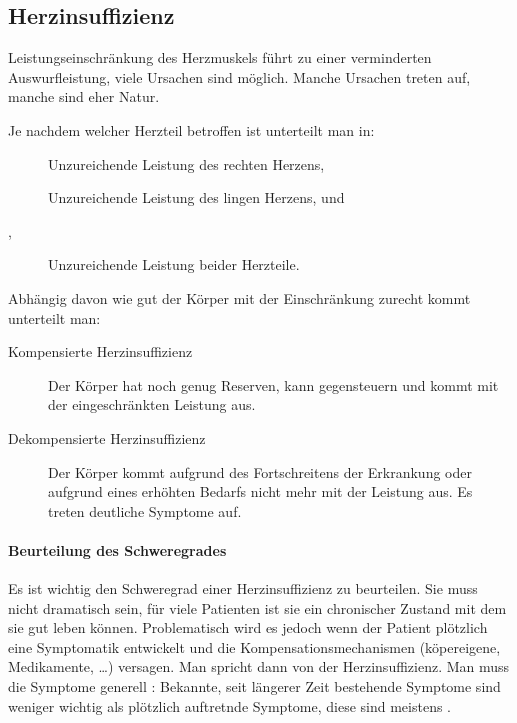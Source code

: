 \subsection{Herzinsuffizienz}


Leistungseinschränkung des Herzmuskels f\"uhrt zu einer verminderten
Auswurfleistung, viele Ursachen sind m\"oglich. Manche Ursachen treten
 auf, manche sind eher  Natur.

Je nachdem welcher Herzteil betroffen ist unterteilt man in:

\begin{description}
	\item[] Unzureichende Leistung des rechten Herzens, 
	\item[ ] Unzureichende Leistung des lingen Herzens, und
	\item[,] Unzureichende Leistung beider Herzteile.  
\end{description}

Abhängig davon wie gut der Körper mit der Einschränkung zurecht kommt unterteilt man: 

\begin{description}
	\item[Kompensierte Herzinsuffizienz] Der K\"orper hat noch genug Reserven, kann gegensteuern und kommt mit der eingeschränkten Leistung aus.
	\item[Dekompensierte Herzinsuffizienz] Der K\"orper kommt aufgrund des Fortschreitens der Erkrankung oder aufgrund eines erh\"ohten Bedarfs nicht mehr mit der Leistung aus. Es treten deutliche Symptome auf. 
\end{description}

\paragraph*{Beurteilung des Schweregrades}

Es ist wichtig den Schweregrad einer Herzinsuffizienz zu beurteilen. Sie
muss nicht dramatisch sein, f\"ur viele Patienten ist sie ein
chronischer Zustand mit dem sie gut leben k\"onnen.
Problematisch wird es jedoch wenn der Patient pl\"otzlich eine Symptomatik entwickelt und
die Kompensationsmechanismen (k\"opereigene, Medikamente, {\dots})
versagen. Man spricht dann von der  Herzinsuffizienz.
Man muss die Symptome generell : Bekannte, seit längerer Zeit bestehende
Symptome sind weniger wichtig als pl\"otzlich auftretnde Symptome,
diese sind meistens . 

